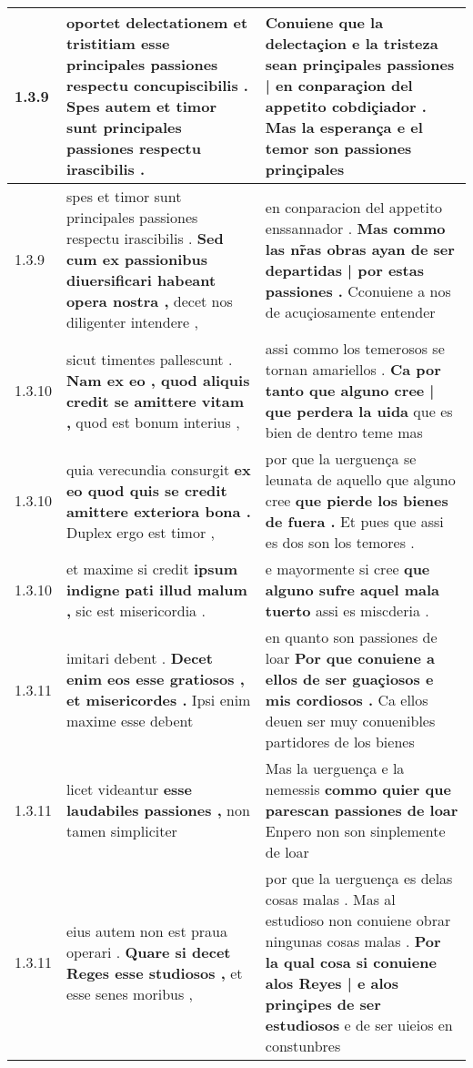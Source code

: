 \begin{tabular}{|p{1cm}|p{6.5cm}|p{6.5cm}|}
1.3.9 & oportet delectationem et tristitiam \textbf{ esse principales passiones respectu concupiscibilis . } Spes autem et timor sunt principales passiones respectu irascibilis . & Conuiene que la delectaçion e la tristeza \textbf{ sean prinçipales passiones | en conparaçion del appetito cobdiçiador . } Mas la esperança e el temor son passiones prinçipales \\\hline
1.3.9 & spes et timor sunt principales passiones respectu irascibilis . \textbf{ Sed cum ex passionibus diuersificari habeant opera nostra , } decet nos diligenter intendere , & en conparacion del appetito enssannador . \textbf{ Mas commo las nr̃as obras ayan de ser departidas | por estas passiones . } Cconuiene a nos de acuçiosamente entender \\\hline
1.3.10 & sicut timentes pallescunt . \textbf{ Nam ex eo , quod aliquis credit se amittere vitam , } quod est bonum interius , & assi commo los temerosos se tornan amariellos . \textbf{ Ca por tanto que alguno cree | que perdera la uida } que es bien de dentro teme mas \\\hline
1.3.10 & quia verecundia consurgit \textbf{ ex eo quod quis se credit amittere exteriora bona . } Duplex ergo est timor , & por que la uerguença se leunata de aquello que alguno cree \textbf{ que pierde los bienes de fuera . } Et pues que assi es dos son los temores . \\\hline
1.3.10 & et maxime si credit \textbf{ ipsum indigne pati illud malum , } sic est misericordia . & e mayormente si cree \textbf{ que alguno sufre aquel mala tuerto } assi es miscderia . \\\hline
1.3.11 & imitari debent . \textbf{ Decet enim eos esse gratiosos , et misericordes . } Ipsi enim maxime esse debent & en quanto son passiones de loar \textbf{ Por que conuiene a ellos de ser guaçiosos e mis cordiosos . } Ca ellos deuen ser muy conuenibles partidores de los bienes \\\hline
1.3.11 & licet videantur \textbf{ esse laudabiles passiones , } non tamen simpliciter & Mas la uerguença e la nemessis \textbf{ commo quier que parescan passiones de loar } Enpero non son sinplemente de loar \\\hline
1.3.11 & eius autem non est praua operari . \textbf{ Quare si decet Reges esse studiosos , } et esse senes moribus , & por que la uerguença es delas cosas malas . Mas al estudioso non conuiene obrar ningunas cosas malas . \textbf{ Por la qual cosa si conuiene alos Reyes | e alos prinçipes de ser estudiosos } e de ser uieios en constunbres \\\hline

\end{tabular}
